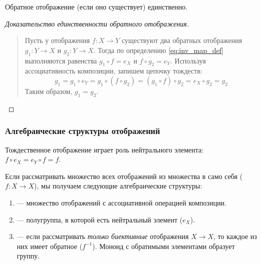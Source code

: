 \begin{theorem}
    Обратное отображение (если оно существует) единственно.
\end{theorem}

\begin{proof}[Доказательство единственности обратного отображения]~\\
    \begin{quote}
        Пусть у отображения $f: X \to Y$ существуют два обратных 
        отображения $g_1: Y \to X$ и $g_2: Y \to X$. Тогда по определению 
        \eqref{eq:inv_map_def} выполняются равенства $g_1 \circ f = e_X$ и 
        $f \circ g_2 = e_Y$. Используя ассоциативность композиции, запишем 
        цепочку тождеств:
        \[
            g_1 = g_1 \circ e_Y = g_1 \circ (f \circ g_2) = 
            (g_1 \circ f) \circ g_2 = e_X \circ g_2 = g_2
        \]
        Таким образом, $g_1 = g_2$.
    \end{quote}
\end{proof}

\subsubsection{Алгебраические структуры отображений}

Тождественное отображение играет роль нейтрального элемента: \(f \circ e_X = e_Y \circ f = f\).

Если рассматривать множество всех отображений из множества в само себя (\(f: X \to X\)), мы получаем следующие алгебраические структуры:
\begin{enumerate}
    \item {} — множество отображений с ассоциативной операцией композиции.
    \item {} — полугруппа, в которой есть нейтральный элемент (\(e_X\)).
    \item {} — если рассматривать \emph{только биективные} отображения \(X \to X\), то каждое из них имеет обратное (\(f^{-1}\)). Моноид с обратимыми элементами образует группу.
\end{enumerate}